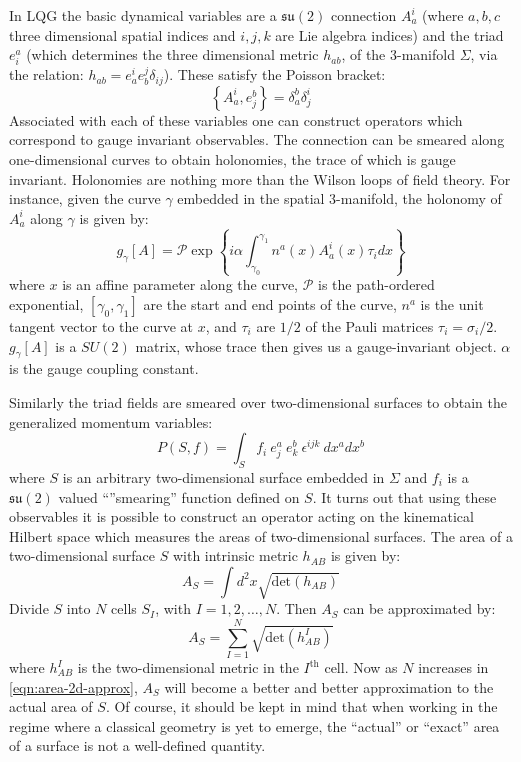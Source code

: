 \documentclass[a4paper]{article}
\newcommand{\mc}[1]{\mathcal{#1}}
\newcommand{\mf}[1]{\mathfrak{#1}}
\begin{document}
In LQG the basic dynamical variables are \cite{Ashtekar2004Background} a $ \mf{su}(2) $ connection $ A_a^i $ (where $ a,b,c $ three dimensional spatial indices and $ i,j,k $ are Lie algebra indices) and the triad  $ e^a_i $ (which determines the three dimensional metric $ h_{ab} $, of the 3-manifold $ \Sigma $, via the relation: $ h_{ab} = e_a^i e_b^j \delta_{ij} $). These satisfy the Poisson bracket:
\begin{equation}\label{eqn:poisson-bracket}
	\left\{ A_a^i, e^b_j \right\} = \delta^b_a \delta^i_j
\end{equation}
Associated with each of these variables one can construct operators which correspond to gauge invariant observables. The connection can be smeared along one-dimensional curves to obtain holonomies, the trace of which is gauge invariant. Holonomies are nothing more than the Wilson loops of field theory. For instance, given the curve $ \gamma $ embedded in the spatial 3-manifold, the holonomy of $ A_a^i $ along $ \gamma $ is given by:
\begin{equation}\label{eqn:holonomy}
	g_\gamma[A] = \mc{P} \exp \left\{ i \alpha \int_{\gamma_0}^{\gamma_1} n^a(x) A_a^i(x) \tau_i dx  \right\}
\end{equation}
where $ x $ is an affine parameter along the curve, $ \mc{P} $ is the path-ordered exponential, $ [\gamma_0, \gamma_1] $ are the start and end points of the curve, $ n^a $ is the unit tangent vector to the curve at $ x $, and $ \tau_i $ are $ 1/2 $ of the Pauli matrices $ \tau_i = \sigma_i/2 $. $ g_\gamma[A] $ is a $ SU(2) $ matrix, whose trace then gives us a gauge-invariant object. $ \alpha $ is the gauge coupling constant.

Similarly the triad fields are smeared over two-dimensional surfaces to obtain the generalized momentum variables:
\begin{equation}\label{eqn:triad}
P(S, f) = \int_S f_i~e^a_j~e^b_k~\epsilon^{ijk}~dx^a dx^b
\end{equation}
where $ S $ is an arbitrary two-dimensional surface embedded in $ \Sigma $ and $ f_i $ is a $ \mf{su}(2) $ valued ``''smearing'' function defined on $ S $. It turns out that using these observables it is possible to construct an operator acting on the kinematical Hilbert space which measures the areas of two-dimensional surfaces. The area of a two-dimensional surface $ S $ with intrinsic metric $ h_{AB} $ is given by:
\begin{equation}\label{eqn:area-2d}
	A_S = \int d^2 x \sqrt{\text{det}(h_{AB})}
\end{equation}
Divide $ S $ into $ N $ cells $ S_I $, with $ I = 1,2,\ldots,N $. Then $ A_S $ can be approximated by:
\begin{equation}\label{eqn:area-2d-approx}
	A_S = \sum_{I=1}^N \sqrt{\text{det}(h^I_{AB})}
\end{equation}
where $ h^I_{AB} $ is the two-dimensional metric in the $ I^\text{th} $ cell. Now as $ N $ increases in \eqref{eqn:area-2d-approx}, $ A_S $ will become a better and better approximation to the actual area of $ S $. Of course, it should be kept in mind that when working in the regime where a classical geometry is yet to emerge, the ``actual'' or ``exact'' area of a surface is not a well-defined quantity.
\end{document}
